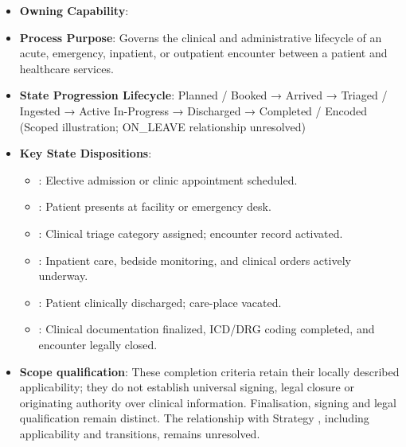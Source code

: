 \begin{itemize}

\item
\textbf{Owning Capability}: \texttt{}



\item
\textbf{Process Purpose}: Governs the clinical and administrative lifecycle of an acute, emergency, inpatient, or outpatient encounter between a patient and healthcare services.



\item
\textbf{State Progression Lifecycle}: Planned /\allowbreak{} Booked → Arrived → Triaged /\allowbreak{} Ingested → Active In-Progress → Discharged → Completed /\allowbreak{} Encoded   (Scoped illustration; ON\_LEAVE relationship unresolved)



\item
\textbf{Key State Dispositions}:


\begin{itemize}

\item
\texttt{}: Elective admission or clinic appointment scheduled.



\item
\texttt{}: Patient presents at facility or emergency desk.



\item
\texttt{}: Clinical triage category assigned; encounter record activated.



\item
\texttt{}: Inpatient care, bedside monitoring, and clinical orders actively underway.



\item
\texttt{}: Patient clinically discharged; care-place vacated.



\item
\texttt{}: Clinical documentation finalized, ICD/\allowbreak{}DRG coding completed, and encounter legally closed.



\end{itemize}


\item
\textbf{Scope qualification}: These completion criteria retain their locally described applicability; they do not establish universal signing, legal closure or originating authority over clinical information. Finalisation, signing and legal qualification remain distinct. The relationship with Strategy \texttt{}, including applicability and transitions, remains unresolved.



\end{itemize}
\label{rad:processes:133}

